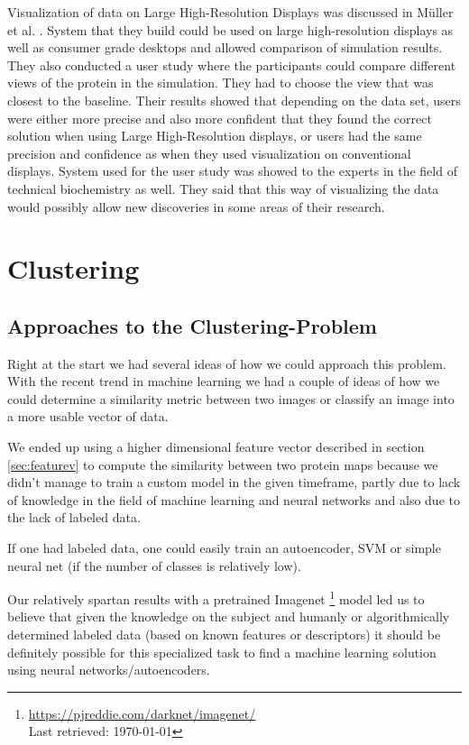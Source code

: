 \documentclass[journal]{vgtc}       %
\newcommand{\todo}[1]{\textcolor{red}{\textbf{TODO:} #1}}
\begin{document}
Visualization of data on Large High-Resolution Displays was discussed in Müller et al. \cite{powerwall}. System that they build could be used on large high-resolution displays as well as consumer grade desktops and allowed comparison of simulation results. They also conducted a user study where the participants could compare different views of the protein in the simulation. They had to choose the view that was closest to the baseline. Their results showed that depending on the data set, users were either more precise and also more confident that they found the correct solution when using Large High-Resolution displays, or users had the same precision and confidence as when they used visualization on conventional displays. System used for the user study was showed to the experts in the field of technical biochemistry as well. They said that this way of visualizing the data would possibly allow new discoveries in some areas of their research.

\section{Clustering}
\subsection{Approaches to the Clustering-Problem}

Right at the start we had several ideas of how we could approach this problem. 
With the recent trend in machine learning we had a couple of ideas of how we could determine a similarity metric between two images or classify an image into a more usable vector of data.

We ended up using a higher dimensional feature vector described in section \ref{sec:featurev} to  compute the similarity between two protein maps because we didn't manage to train a custom model in the given timeframe, partly due to lack of knowledge in the field of machine learning and neural networks and also due to the lack of labeled data.

If one had labeled data, one could easily train an autoencoder, SVM or simple neural net (if the number of classes is relatively low).

Our relatively spartan results with a pretrained Imagenet \cite{imagenet}\footnote{\url{https://pjreddie.com/darknet/imagenet/} \\ Last retrieved: \today}  model led us to believe that given the knowledge on the subject and humanly or algorithmically determined labeled data (based on known features or descriptors)   it should be definitely possible for this specialized task to find a machine learning  solution using neural networks/autoencoders.
\end{document}

